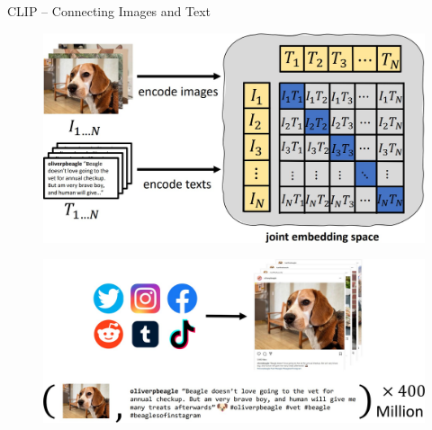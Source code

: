 \begin{frame}[allowframebreaks]{CLIP – Connecting Images and Text}
\begin{figure}
    \end{figure}
\framebreak
    \begin{figure}
        \centering
        \includegraphics[width=1\textwidth,height=0.9\textheight,keepaspectratio]{images/video/slide_53_1_img.jpg}
    \end{figure}
\framebreak
    \begin{figure}
        \centering
        \includegraphics[width=1\textwidth,height=0.9\textheight,keepaspectratio]{images/video/slide_54_1_img.jpg}
    \end{figure}
\end{frame}


